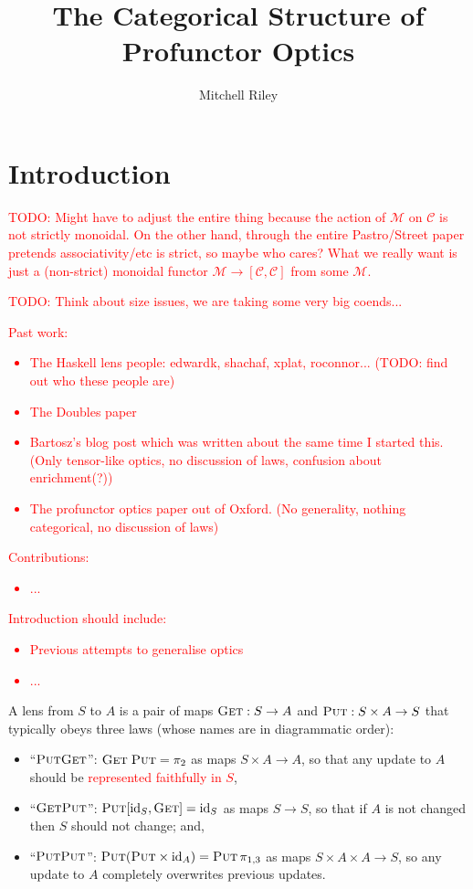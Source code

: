 \documentclass[11pt,a4paper]{article}
\title{The Categorical Structure of Profunctor Optics}
\author{Mitchell Riley}
\theoremstyle{plain}
\theoremstyle{definition}
\newcommand{\C}{\mathscr{C}}
\newcommand{\M}{\mathscr{M}}
\newcommand{\id}{\mathrm{id}}
\newcommand{\fget}{\textsc{Get}}
\newcommand{\fput}{\textsc{Put}}
\newcommand{\todo}[1]{\textcolor{red}{\small #1}}
\begin{document}
\maketitle

\section{Introduction}

\todo{TODO: Might have to adjust the entire thing because the action of $\M$ on $\C$ is not strictly monoidal. On the other hand, through the entire Pastro/Street paper pretends associativity/etc is strict, so maybe who cares? What we really want is just a (non-strict) monoidal functor $\M \to [\C, \C]$ from some $\M$.}

\todo{TODO: Think about size issues, we are taking some very big coends...}

\todo{Past work:
\begin{itemize}
\item The Haskell lens people: edwardk, shachaf, xplat, roconnor... (TODO: find out who these people are)
\item The Doubles paper
\item Bartosz's blog post which was written about the same time I started this. (Only tensor-like optics, no discussion of laws, confusion about enrichment(?))
\item The profunctor optics paper out of Oxford. (No generality, nothing categorical, no discussion of laws)
\end{itemize}
}

\todo{Contributions:
\begin{itemize}
\item ...
\end{itemize}
}

\todo{Introduction should include:
\begin{itemize}
\item Previous attempts to generalise optics
\item ...
\end{itemize}
}
A lens from $S$ to $A$ is a pair of maps $\fget : S \to A$ and $\fput : S \times A \to S$ that typically obeys three laws (whose names are in diagrammatic order):
\begin{itemize}
\item ``$\fput\fget$'': $\fget \; \fput = \pi_2$ as maps $S \times A \to A$, so that any update to $A$ should be \todo{represented faithfully in $S$},
\item ``$\fget\fput$'': $\fput [\id_S, \fget] = \id_S$ as maps $S \to S$, so that if $A$ is not changed then $S$ should not change; and,
\item ``$\fput\fput$'': $\fput (\fput \times \id_A) = \fput \, \pi_{1, 3}$ as maps $S \times A \times A \to S$, so any update to $A$ completely overwrites previous updates.
\end{itemize}
\end{document}
